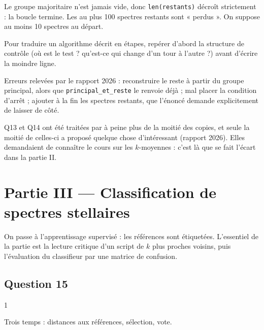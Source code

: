 \documentclass[11pt,a4paper]{article}
\begin{document}
Le groupe majoritaire n'est jamais vide, donc \texttt{len(restants)} décroît strictement : la boucle termine. Les au plus 100 spectres restants sont « perdus ». On suppose au moins 10 spectres au départ.

\begin{methode}

Pour traduire un algorithme décrit en étapes, repérer d'abord la structure de contrôle (où est le test ? qu'est-ce qui change d'un tour à l'autre ?) avant d'écrire la moindre ligne.

\end{methode}

\begin{piege}

Erreurs relevées par le rapport 2026 : reconstruire le reste à partir du groupe principal, alors que \texttt{principal\_et\_reste} le renvoie déjà ; mal placer la condition d'arrêt ; ajouter à la fin les spectres restants, que l'énoncé demande explicitement de laisser de côté.

\end{piege}

\begin{jury}

Q13 et Q14 ont été traitées par à peine plus de la moitié des copies, et seule la moitié de celles-ci a proposé quelque chose d'intéressant (rapport 2026). Elles demandaient de connaître le cours sur les \(k\)-moyennes : c'est là que se fait l'écart dans la partie II.

\end{jury}

\hypertarget{partie-iii-classification-de-spectres-stellaires}{%
\section{Partie III --- Classification de spectres stellaires}\label{partie-iii-classification-de-spectres-stellaires}}

On passe à l'apprentissage supervisé : les références sont étiquetées. L'essentiel de la partie est la lecture critique d'un script de \(k\) plus proches voisins, puis l'évaluation du classifieur par une matrice de confusion.

\hypertarget{question-15}{%
\subsection{Question 15}\label{question-15}}

\begin{indication}{1}

Trois temps : distances aux références, sélection, vote.

\end{indication}
\end{document}

